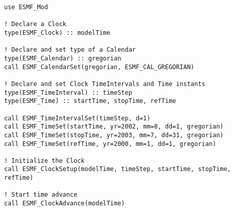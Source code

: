 
\begin{verbatim}
use ESMF_Mod

! Declare a Clock
type(ESMF_Clock) :: modelTime

! Declare and set type of a Calendar
type(ESMF_Calendar) :: gregorian
call ESMF_CalendarSet(gregorian, ESMF_CAL_GREGORIAN)

! Declare and set Clock TimeIntervals and Time instants
type(ESMF_TimeInterval) :: timeStep
type(ESMF_Time) :: startTime, stopTime, refTime

call ESMF_TimeIntervalSet(timeStep, d=1)
call ESMF_TimeSet(startTime, yr=2002, mm=8, dd=1, gregorian)
call ESMF_TimeSet(stopTime, yr=2003, mm=7, dd=31, gregorian)
call ESMF_TimeSet(refTime, yr=2000, mm=1, dd=1, gregorian)

! Initialize the Clock
call ESMF_ClockSetup(modelTime, timeStep, startTime, stopTime, refTime)

! Start time advance
call ESMF_ClockAdvance(modelTime)
\end{verbatim}


